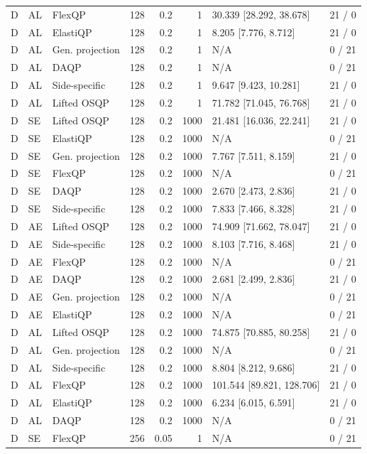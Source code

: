 \begin{longtable}{@{}lllrrrlr@{}}
D & AL & FlexQP & 128 & 0.2 & 1 & 30.339 [28.292, 38.678] & 21 / 0 \\
D & AL & ElastiQP & 128 & 0.2 & 1 & 8.205 [7.776, 8.712] & 21 / 0 \\
D & AL & Gen. projection & 128 & 0.2 & 1 & N/A & 0 / 21 \\
D & AL & DAQP & 128 & 0.2 & 1 & N/A & 0 / 21 \\
D & AL & Side-specific & 128 & 0.2 & 1 & 9.647 [9.423, 10.281] & 21 / 0 \\
D & AL & Lifted OSQP & 128 & 0.2 & 1 & 71.782 [71.045, 76.768] & 21 / 0 \\
D & SE & Lifted OSQP & 128 & 0.2 & 1000 & 21.481 [16.036, 22.241] & 21 / 0 \\
D & SE & ElastiQP & 128 & 0.2 & 1000 & N/A & 0 / 21 \\
D & SE & Gen. projection & 128 & 0.2 & 1000 & 7.767 [7.511, 8.159] & 21 / 0 \\
D & SE & FlexQP & 128 & 0.2 & 1000 & N/A & 0 / 21 \\
D & SE & DAQP & 128 & 0.2 & 1000 & 2.670 [2.473, 2.836] & 21 / 0 \\
D & SE & Side-specific & 128 & 0.2 & 1000 & 7.833 [7.466, 8.328] & 21 / 0 \\
D & AE & Lifted OSQP & 128 & 0.2 & 1000 & 74.909 [71.662, 78.047] & 21 / 0 \\
D & AE & Side-specific & 128 & 0.2 & 1000 & 8.103 [7.716, 8.468] & 21 / 0 \\
D & AE & FlexQP & 128 & 0.2 & 1000 & N/A & 0 / 21 \\
D & AE & DAQP & 128 & 0.2 & 1000 & 2.681 [2.499, 2.836] & 21 / 0 \\
D & AE & Gen. projection & 128 & 0.2 & 1000 & N/A & 0 / 21 \\
D & AE & ElastiQP & 128 & 0.2 & 1000 & N/A & 0 / 21 \\
D & AL & Lifted OSQP & 128 & 0.2 & 1000 & 74.875 [70.885, 80.258] & 21 / 0 \\
D & AL & Gen. projection & 128 & 0.2 & 1000 & N/A & 0 / 21 \\
D & AL & Side-specific & 128 & 0.2 & 1000 & 8.804 [8.212, 9.686] & 21 / 0 \\
D & AL & FlexQP & 128 & 0.2 & 1000 & 101.544 [89.821, 128.706] & 21 / 0 \\
D & AL & ElastiQP & 128 & 0.2 & 1000 & 6.234 [6.015, 6.591] & 21 / 0 \\
D & AL & DAQP & 128 & 0.2 & 1000 & N/A & 0 / 21 \\
D & SE & FlexQP & 256 & 0.05 & 1 & N/A & 0 / 21 \\

\end{longtable}
